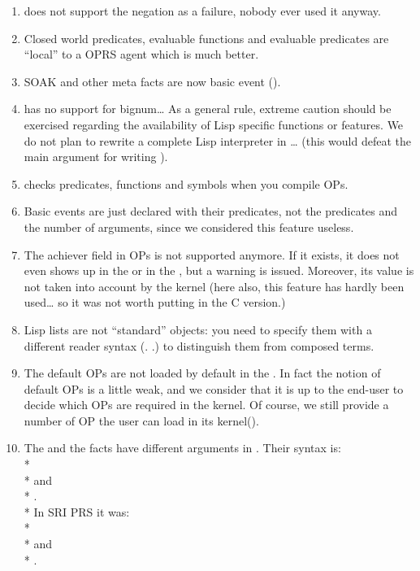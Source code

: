 \begin{enumerate}
\item \COPRS{} does not support the negation as a failure, nobody ever used
it anyway.

\item Closed world predicates, evaluable functions and evaluable predicates
are ``local'' to a OPRS agent which is much better.

\item SOAK and other meta facts are now basic event ().

\item \COPRS{} has no support for bignum\dots{} As a general rule, extreme
caution should be exercised regarding the availability of Lisp specific
functions or features. We do not plan to rewrite a complete Lisp
interpreter in \COPRS{}\dots{} (this would defeat the main argument for
writing \COPRS{}).

\item \COPRS{} checks predicates, functions and symbols when you compile
OPs.

\item Basic events are just declared with their predicates, not the
predicates and the number of arguments, since we considered this feature
useless.

\item The achiever field in OPs is not supported anymore. If it exists, it
does not even shows up in the \OPE{} or in the \XPK, but a warning is
issued. Moreover, its value is not taken into account by the kernel (here
also, this feature has hardly been used\dots{} so it was not worth putting
in the C version.)

\item Lisp lists are not ``standard'' objects: you need to specify them
with a different reader syntax (. .) to distinguish them from composed
terms.

\item The default OPs are not loaded by default in the \CPK{}. In
fact the notion of default OPs is a little weak, and we consider that it
is up to the end-user to decide which OPs are required in the kernel. Of
course, we still provide a number of OP the user can load in its
kernel().

\item The  and the 
facts have different arguments in \CPK{}. Their syntax is: \\*
 \\*
and \\*
. \\*
In SRI PRS it was: \\*
 \\*
and \\*
.


\end{enumerate}
